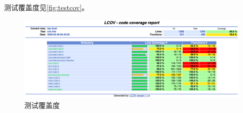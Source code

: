 测试覆盖度见\autoref{fig:testcov}。
\begin{figure}[hbt]
  \centering
  \includegraphics[scale=.3]{coverage.png}
  \caption{测试覆盖度}\label{fig:testcov}
\end{figure}

